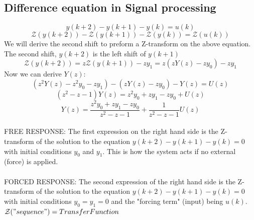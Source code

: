 \documentclass[a4paper,11pt]{article}
\begin{document}
	\subsection{Difference equation in Signal processing}
		\begin{equation} 
			y(k+2)-y(k+1)-y(k)=u(k)
		\end{equation}	
		\begin{equation} 
			\mathcal{Z}(y(k+2))-\mathcal{Z}(y(k+1))-\mathcal{Z}(y(k))=\mathcal{Z}(u(k))
		\end{equation}
		We will derive the second shift to preform a Z-transform on the above equation.\\
		The second shift, $y(k+2)$ is the left shift of $y(k+1)$
		\begin{equation} 
			\mathcal{Z}(y(k+2))=z\mathcal{Z}(y(k+1))-zy_1=z(zY(z)-zy_0)-zy_1
		\end{equation}
		Now we can derive $Y(z)$:
		\begin{equation} 
			(z^2Y(z)-z^2y_0-zy_1)-(zY(z)-zy_0) -Y(z) = U(z)
		\end{equation}	
		\begin{equation} 
			(z^2-z-1)Y(z) = z^2y_0+zy_1-zy_0 +U(z)
		\end{equation}
		\begin{equation} 
			Y(z) =\frac{z^2y_0+zy_1-zy_0}{z^2-z-1}+\frac{1}{z^2-z-1}U(z)
		\end{equation}	\\
		FREE RESPONSE: The first expression on the right hand side is the Z-transform of the solution to the equation $y(k+2)-y(k+1)-y(k)=0$ with initial conditions $y_0$ and $y_1$. This is how the system acts if no external (force) is applied.\\\\
		FORCED RESPONSE: The second expression of the right hand side is the Z-transform of the solution to the equation $y(k+2)-y(k+1)-y(k)=0$ with initial conditions $y_0=y_1=0$ and the "forcing term" (input) being $u(k)$.\\
		$\mathcal{Z}("sequence")=Transfer Function$
\end{document}
